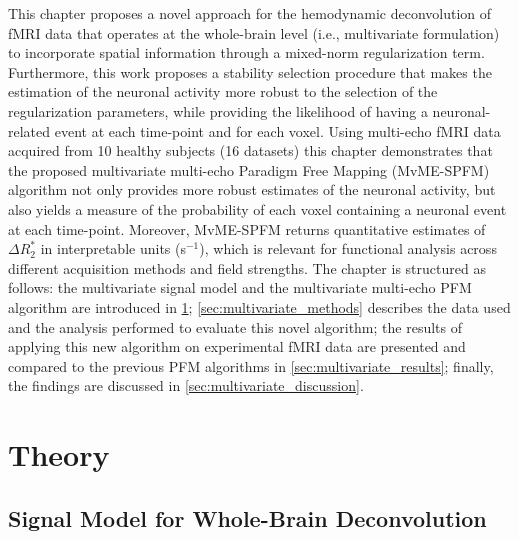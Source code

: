 This chapter proposes a novel approach for the hemodynamic deconvolution of fMRI
data that operates at the whole-brain level (i.e., multivariate formulation) to
incorporate spatial information through a mixed-norm regularization term.
Furthermore, this work proposes a stability selection procedure
\citep{Meinshausen2010Stabilityselection} that makes the estimation of the
neuronal activity more robust to the selection of the regularization parameters,
while providing the likelihood of having a neuronal-related event at each
time-point and for each voxel. Using multi-echo fMRI data acquired from 10
healthy subjects (16 datasets) this chapter demonstrates that the proposed
multivariate multi-echo Paradigm Free Mapping (MvME-SPFM) algorithm not only provides
more robust estimates of the neuronal activity, but also yields a measure of the
probability of each voxel containing a neuronal event at each time-point.
Moreover, MvME-SPFM returns quantitative estimates of $\Delta R_2^*$ in
interpretable units (s$^{-1}$), which is relevant for functional analysis across
different acquisition methods and field strengths. The chapter is structured as
follows: the multivariate signal model and the multivariate multi-echo PFM
algorithm are introduced in \cref{sec:multivariate_theory};
\cref{sec:multivariate_methods} describes the data used and the analysis
performed to evaluate this novel algorithm; the results of applying this new
algorithm on experimental fMRI data are presented and compared to the previous
PFM algorithms in \cref{sec:multivariate_results}; finally, the findings are
discussed in \cref{sec:multivariate_discussion}.

\section{Theory}
\label{sec:multivariate_theory}

\subsection{Signal Model for Whole-Brain Deconvolution}


